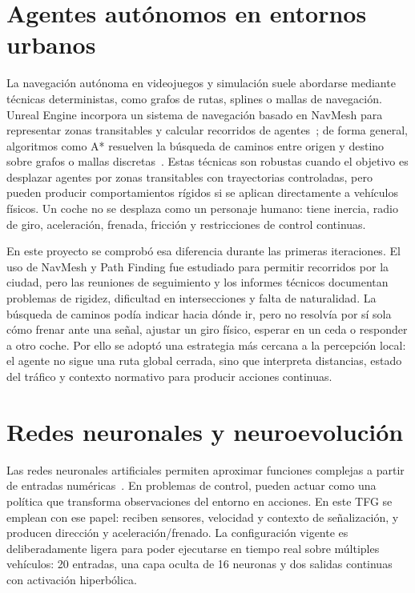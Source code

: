 \section{Agentes autónomos en entornos urbanos}

La navegación autónoma en videojuegos y simulación suele abordarse mediante técnicas deterministas, como grafos de rutas, splines o mallas de navegación. Unreal Engine incorpora un sistema de navegación basado en NavMesh para representar zonas transitables y calcular recorridos de agentes~\cite{unrealnavigation}; de forma general, algoritmos como A* resuelven la búsqueda de caminos entre origen y destino sobre grafos o mallas discretas~\cite{redblobpathfinding}. Estas técnicas son robustas cuando el objetivo es desplazar agentes por zonas transitables con trayectorias controladas, pero pueden producir comportamientos rígidos si se aplican directamente a vehículos físicos. Un coche no se desplaza como un personaje humano: tiene inercia, radio de giro, aceleración, frenada, fricción y restricciones de control continuas.

En este proyecto se comprobó esa diferencia durante las primeras iteraciones. El uso de NavMesh y Path Finding fue estudiado para permitir recorridos por la ciudad, pero las reuniones de seguimiento y los informes técnicos documentan problemas de rigidez, dificultad en intersecciones y falta de naturalidad. La búsqueda de caminos podía indicar hacia dónde ir, pero no resolvía por sí sola cómo frenar ante una señal, ajustar un giro físico, esperar en un ceda o responder a otro coche. Por ello se adoptó una estrategia más cercana a la percepción local: el agente no sigue una ruta global cerrada, sino que interpreta distancias, estado del tráfico y contexto normativo para producir acciones continuas.

\section{Redes neuronales y neuroevolución}

Las redes neuronales artificiales permiten aproximar funciones complejas a partir de entradas numéricas~\cite{cybenko}. En problemas de control, pueden actuar como una política que transforma observaciones del entorno en acciones. En este TFG se emplean con ese papel: reciben sensores, velocidad y contexto de señalización, y producen dirección y aceleración/frenado. La configuración vigente es deliberadamente ligera para poder ejecutarse en tiempo real sobre múltiples vehículos: 20 entradas, una capa oculta de 16 neuronas y dos salidas continuas con activación hiperbólica.

